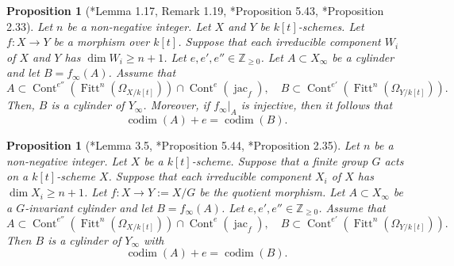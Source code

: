 \documentclass[a4paper,11pt]{amsart}
\newtheorem{prop}[thm]{Proposition}
\theoremstyle{definition}
\theoremstyle{remark}
\begin{document}
\begin{prop}[{\cite{DL02}*{Lemma 1.17, Remark 1.19}, \cite{NS2}*{Proposition 5.43}, \cite{NS22}*{Proposition 2.33}}]\label{prop:EM6.2_k[t]}
Let $n$ be a non-negative integer. 
Let $X$ and $Y$ be $k[t]$-schemes.
Let $f: X \to Y$ be a morphism over $k[t]$. 
Suppose that each irreducible component $W_i$ of $X$ and $Y$ has $\dim W_i \ge n + 1$. 
Let $e,e',e''\in \mathbb Z_{\ge 0}$. 
Let $A \subset X_{\infty}$ be a cylinder and let $B = f_{\infty}(A)$. 
Assume that 
\[
A  \subset \operatorname{Cont}^{e''} \left( \operatorname{Fitt}^n \left( \Omega _{X/k[t]} \right)  \right) 
	\cap \operatorname{Cont}^{e} \left( \operatorname{jac}_f \right), \quad
B  \subset \operatorname{Cont}^{e'} \left( \operatorname{Fitt}^n \left( \Omega _{Y/k[t]} \right)  \right). 
\]
Then, $B$ is a cylinder of $Y_{\infty}$. 
Moreover, if $f_{\infty}|_{A}$ is injective, then it follows that
\[
\operatorname{codim}(A) + e = \operatorname{codim}(B).
\]
\end{prop}


\begin{prop}[{\cite{DL02}*{Lemma 3.5}, \cite{NS2}*{Proposition 5.44}, \cite{NS22}*{Proposition 2.35}}]\label{prop:DL2_k[t]}
Let $n$ be a non-negative integer. Let $X$ be a $k[t]$-scheme. 
Suppose that a finite group $G$ acts on a $k[t]$-scheme $X$. 
Suppose that each irreducible component $X_i$ of $X$ has $\dim X_i \ge n + 1$. 
Let $f: X \to Y := X/G$ be the quotient morphism. 
Let $A \subset X_{\infty}$ be a $G$-invariant cylinder and let $B = f_{\infty} (A)$. 
Let $e,e',e''\in \mathbb Z_{\ge 0}$. 
Assume that 
\[
A  \subset \operatorname{Cont}^{e''} \left( \operatorname{Fitt}^n \left( \Omega _{X/k[t]} \right)  \right) 
	\cap \operatorname{Cont}^{e} \left( \operatorname{jac}_f \right), \quad
B  \subset \operatorname{Cont}^{e'} \left( \operatorname{Fitt}^n \left( \Omega _{Y/k[t]} \right)  \right). 
\]
Then $B$ is a cylinder of $Y_{\infty}$ with 
\[
\operatorname{codim}(A)+e=\operatorname{codim}(B).
\]
\end{prop}
\end{document}
